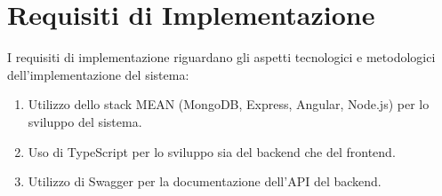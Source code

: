 \section{Requisiti di Implementazione}
I requisiti di implementazione riguardano gli aspetti tecnologici e metodologici dell'implementazione del sistema:
\begin{enumerate}
    \item Utilizzo dello stack MEAN (MongoDB, Express, Angular, Node.js) per lo sviluppo del sistema.
    \item Uso di TypeScript per lo sviluppo sia del backend che del frontend.
    \item Utilizzo di Swagger per la documentazione dell'API del backend.
\end{enumerate}
